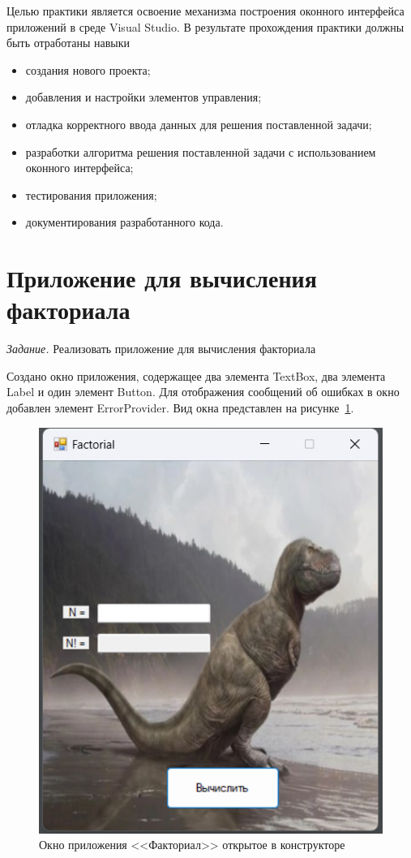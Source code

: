 \documentclass[bachelor, och, pract, times]{SCWorks}
\begin{document}
    
    \intro
    Целью практики является освоение механизма построения оконного интерфейса приложений в среде Visual Studio.\cite{search_1}
    В результате прохождения практики должны быть отработаны навыки
    \begin{itemize}
     
\item  создания нового проекта;
\item добавления и настройки элементов управления;
\item отладка корректного ввода данных для решения поставленной задачи;
\item разработки алгоритма решения поставленной задачи с использованием
оконного интерфейса;
\item тестирования приложения;
\item документирования разработанного кода.

\end{itemize}

\section{Приложение для вычисления факториала}

\textsl{Задание.} Реализовать приложение для вычисления факториала\cite{search_2}

Создано окно приложения, содержащее два элемента TextBox, два элемента Label и один элемент Button\cite{search_4}. Для отображения сообщений об ошибках в окно добавлен элемент ErrorProvider\cite{search_3}. Вид окна представлен на рисунке~\ref{fig:fact-01}.

\begin{figure}[!ht]
    \centering
    \includegraphics[scale=0.7]{Скрины/Снимок экрана 2025-01-03 193935.png}
    \caption{Окно приложения <<Факториал>> открытое в конструкторе}\label{fig:fact-01}
\end{figure}
\end{document}
